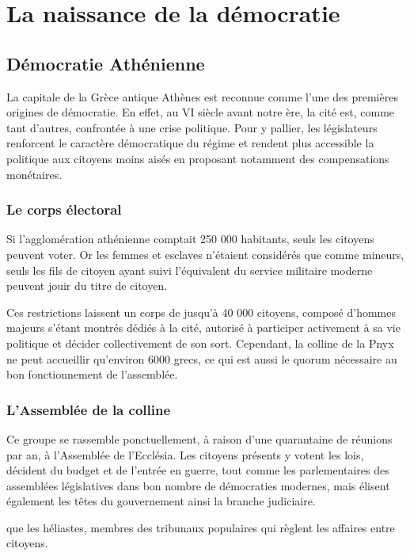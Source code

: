 \documentclass[12pt,a4paper]{report}
\begin{document}
\chapter{La naissance de la démocratie}

\section{Démocratie Athénienne}
La capitale de la Grèce antique Athènes est reconnue comme l'une des premières origines de démocratie. 
En effet, au VI siècle avant notre ère, la cité est, comme tant d'autres, confrontée à une crise politique. 
Pour y pallier, les législateurs renforcent le caractère démocratique du régime et rendent plus accessible la politique aux citoyens moins aisés en proposant notamment des compensations monétaires.

\subsection{Le corps électoral}
Si l'agglomération athénienne comptait 250 000 habitants\nocite{persee:popu}, seuls les citoyens peuvent voter. 
Or les femmes et esclaves n'étaient considérés que comme mineurs, seuls les fils de citoyen ayant suivi l'équivalent du service militaire moderne peuvent jouir du titre de citoyen.

Ces restrictions laissent un corps de jusqu'à 40 000 citoyens, composé d'hommes majeurs s'étant montrés dédiés à la cité, autorisé à participer activement à sa vie politique et décider collectivement de son sort. 
Cependant, la colline de la Pnyx ne peut accueillir qu'environ 6000 grecs, ce qui est aussi le quorum nécessaire au bon fonctionnement de l'assemblée. \nocite{wiki:pnyx}

\subsection{L'Assemblée de la colline}
Ce groupe se rassemble ponctuellement, à raison d'une quarantaine de réunions par an, à l'Assemblée de l'Ecclésia. \nocite{wiki:ecclesia}
Les citoyens présents y votent les lois, décident du budget et de l'entrée en guerre, tout comme les parlementaires des assemblées législatives dans bon nombre de démocraties modernes, mais élisent également les têtes du gouvernement ainsi la branche judiciaire.

que les héliastes, membres des tribunaux populaires qui règlent les affaires entre citoyens. \nocite{wiki:heliastes}
\end{document}
